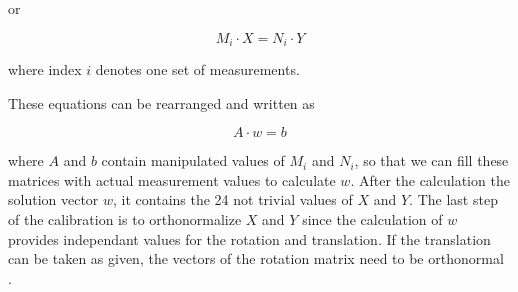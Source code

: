or 

\begin{equation}
	M_i \cdot X = N_i \cdot Y
\end{equation}

where index $i$ denotes one set of measurements. 

These equations can be rearranged and written as 

\begin{equation}
	A \cdot w = b
\end{equation}

where $A$ and $b$ contain manipulated values of $M_i$ and $N_i$, so that we can fill these matrices with 
actual measurement values to calculate $w$. After the calculation the solution vector $w$, it contains the
24 not trivial values of $X$ and $Y$. The last step of the calibration is to orthonormalize $X$ and $Y$
since the calculation of $w$ provides independant values for the rotation and translation. 
If the translation can be taken as given, the vectors of the rotation matrix need to be orthonormal \cite{ref:hand_eye_calib_paper}.